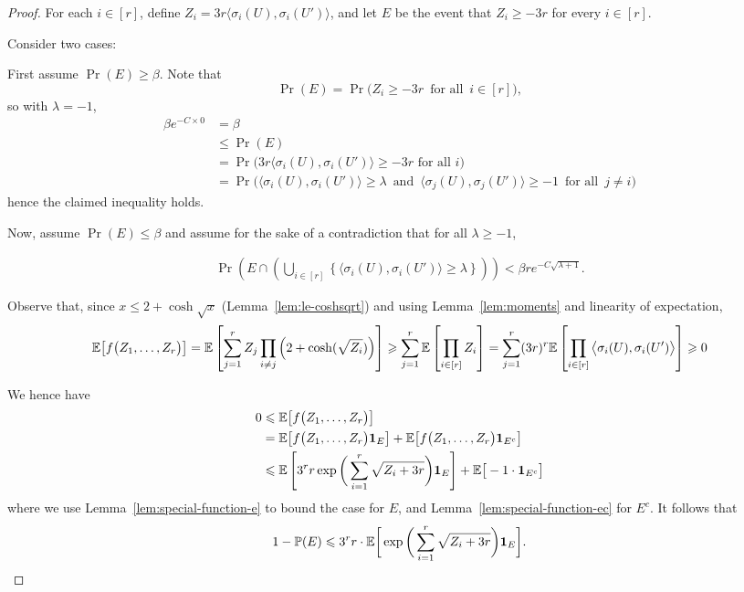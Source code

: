 \begin{proof}
  For each $i \in [r]$, define $Z_i = 3r\big\langle \sigma_i(U),\sigma_i(U') \big\rangle$, and let $E$ be the event that $Z_i \ge -3r$ for every $i \in [r]$.

  Consider two cases:

  First assume $\Pr(E) \ge \beta$. Note that
  $$\Pr(E) = \Pr\Big( Z_i \ge - 3r \, \text{ for all } \, i \in [r] \Big),$$
  so with $\lambda = -1$,
  \begin{align*}
    \beta e^{-C\times 0} &= \beta\\
    &\le \Pr(E)\\
    &= \Pr\Big(3r\big\langle \sigma_i(U),\sigma_i(U') \big\rangle \ge -3r \text{ for all }i\Big)\\
    &= \Pr\Big( \big\langle \sigma_i(U),\sigma_i(U') \big\rangle \ge \lambda \, \text{ and } \, \big\langle \sigma_j(U), \sigma_j(U') \big\rangle \ge -1 \, \text{ for all } \, j \ne i \Big)
  \end{align*}
  hence the claimed inequality holds.

  Now, assume $\Pr(E) \le \beta$ and assume for the sake of a contradiction that for all $\lambda \geq -1$,

  \begin{align}\label{eq:max:big:and:E:no}
    \Pr\left(E \cap \left( \bigcup_{i \in [r]} \left\{ \big\langle \sigma_i(U),\sigma_i(U') \big\rangle \ge \lambda \right\}\right)\right) < \beta r e^{-C\sqrt{\lambda + 1}}.
  \end{align}

  Observe that, since $x \le 2 + \cosh\sqrt{x}$ (Lemma~\ref{lem:le-coshsqrt}) and using Lemma~\ref{lem:moments} and linearity of expectation,
  \[
    \mathbb{E}\big[ f\big( Z_1,\ldots,Z_r \big) \big] = \mathbb{E}\left[ \sum_{j = 1}^r Z_j \prod_{i \ne j} \left( 2 + \cosh(\sqrt{Z_i}) \right) \right]
    \geqslant \sum_{j = 1}^r \mathbb{E}\left[ \prod_{i \in [r]} Z_i \right] = \sum_{j = 1}^r (3r)^r \mathbb{E}\left[ \prod_{i \in [r]} \big\langle \sigma_i(U),\sigma_i(U') \big\rangle \right] \geqslant 0
  \]

  We hence have
  \begin{align*}
    0 &\leqslant \mathbb{E}\big[ f\big( Z_1,\ldots,Z_r \big) \big]\\
    &= \mathbb{E}\big[ f\big( Z_1,\ldots,Z_r \big)  \mathbf{1}_E \big] + \mathbb{E}\big[ f\big( Z_1,\ldots,Z_r \big) \mathbf{1}_{E^c} \big]\\
    &\leqslant \mathbb{E}\left[ 3^r r \exp\bigg( \displaystyle\sum_{i = 1}^r \sqrt{ Z_i + 3r } \bigg)  \mathbf{1}_E \right] + \mathbb{E}\big[-1 \cdot \mathbf{1}_{E^c} \big]
  \end{align*}
  where we use Lemma~\ref{lem:special-function-e} to bound the case for $E$, and Lemma~\ref{lem:special-function-ec} for $E^c$.
  It follows that
  \begin{equation}\label{eq:eventE:inequality}
    1 - \mathbb{P}(E) \leqslant 3^r r \cdot \mathbb{E}\bigg[ \exp\bigg( \sum_{i = 1}^r \sqrt{ Z_i + 3r } \bigg) \mathbf{1}_E \bigg].
  \end{equation}


\end{proof}
